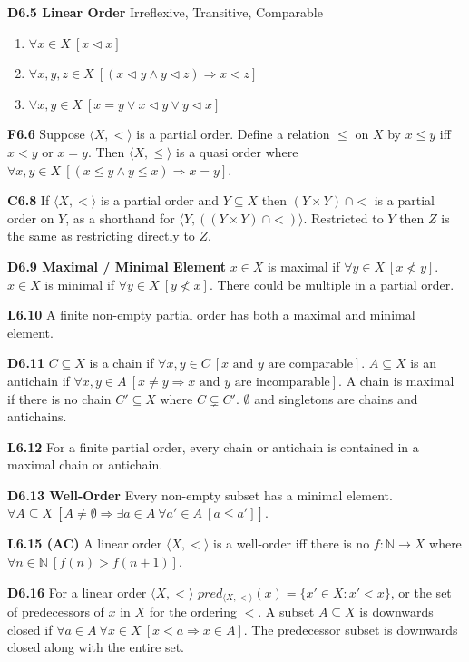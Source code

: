 \documentclass[10pt, landscape]{article}
\begin{document}
\begin{multicols*}{3}
\textbf{D6.5 Linear Order} Irreflexive, Transitive, Comparable
\begin{enumerate}
    \item $\forall x \in X \ [x \lhd x]$
    \item $\forall x, y, z \in X \ [(x \lhd y \land y \lhd z) \Rightarrow x \lhd z]$
    \item $\forall x, y \in X \ [x = y \lor x \lhd y \lor y \lhd x]$
\end{enumerate}

\textbf{F6.6} Suppose $\langle X, < \rangle$ is a partial order. Define a relation $\leq$ on $X$ by $x \leq y$ iff $x < y$ or $x = y$. Then $\langle X, \leq \rangle$ is a quasi order where $\forall x, y \in X \ [(x \leq y \land y \leq x) \Rightarrow x = y]$.

\textbf{C6.8} If $\langle X, < \rangle$ is a partial order and $Y \subseteq X$ then $(Y \times Y) \ \cap <$ is a partial order on $Y$, as a shorthand for $\langle Y, ((Y \times Y)\ \cap <)\rangle$. Restricted to $Y$ then $Z$ is the same as restricting directly to $Z$.

\textbf{D6.9 Maximal / Minimal Element} $x \in X$ is maximal if $\forall y \in X \ [x \not < y]$. $x \in X$ is minimal if $\forall y \in X \ [y \not < x]$. There could be multiple in a partial order.

\textbf{L6.10} A finite non-empty partial order has both a maximal and minimal element.

\textbf{D6.11} $C \subseteq X$ is a chain if $\forall x, y \in C \ [x \text{ and } y \text{ are comparable}]$. $A \subseteq X$ is an antichain if $\forall x, y \in A \ [x \neq y \Rightarrow x \text{ and } y \text{ are incomparable}]$. A chain is maximal if there is no chain $C' \subseteq X$ where $C \subsetneq C'$. $\emptyset$ and singletons are chains and antichains.

\textbf{L6.12} For a finite partial order, every chain or antichain is contained in a maximal chain or antichain.

\textbf{D6.13 Well-Order} Every non-empty subset has a minimal element. $\forall A \subseteq X \ [A \neq \emptyset \Rightarrow \exists a \in A \ \forall a' \in A \ [a \leq a']]$.

\textbf{L6.15 (AC)} A linear order $\langle X, < \rangle$ is a well-order iff there is no $f : \mathbb{N} \rightarrow X$ where $\forall n \in \mathbb{N} \ [f(n) > f(n+1)]$.

\textbf{D6.16} For a linear order $\langle X, < \rangle$ $pred_{\langle X, < \rangle}(x)=\{x' \in X : x' < x\}$, or the set of predecessors of $x$ in $X$ for the ordering $<$. A subset $A \subseteq X$ is downwards closed if $\forall a \in A \ \forall x \in X \ [x < a \Rightarrow x \in A]$. The predecessor subset is downwards closed along with the entire set.


\end{multicols*}
\end{document}

